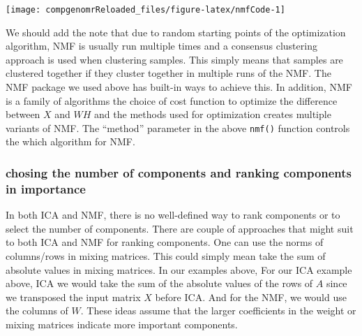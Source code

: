 \documentclass[12pt,]{krantz}
\newenvironment{Shaded}{\begin{snugshade}}{\end{snugshade}}
\newcommand{\CommentTok}[1]{\textcolor[rgb]{0.56,0.35,0.01}{\textit{#1}}}
\newcommand{\DataTypeTok}[1]{\textcolor[rgb]{0.13,0.29,0.53}{#1}}
\newcommand{\DecValTok}[1]{\textcolor[rgb]{0.00,0.00,0.81}{#1}}
\newcommand{\KeywordTok}[1]{\textcolor[rgb]{0.13,0.29,0.53}{\textbf{#1}}}
\newcommand{\NormalTok}[1]{#1}
\newcommand{\OperatorTok}[1]{\textcolor[rgb]{0.81,0.36,0.00}{\textbf{#1}}}
\newcommand{\StringTok}[1]{\textcolor[rgb]{0.31,0.60,0.02}{#1}}
\begin{document}
\begin{Shaded}
\end{Shaded}

\begin{center}\texttt{[image: compgenomrReloaded\_files/figure-latex/nmfCode-1]} \end{center}

We should add the note that due to random starting points of the optimization algorithm, NMF is usually run multiple times and a consensus clustering approach is used when clustering samples. This simply means that samples are clustered together if they cluster together in multiple runs of the NMF. The NMF package we used above has built-in ways to achieve this. In addition, NMF is a family of algorithms the choice of cost function to optimize the difference between \(X\) and \(WH\) and the methods used for optimization creates multiple variants of NMF. The ``method'' parameter in the above \texttt{nmf()} function controls the which algorithm for NMF.

\hypertarget{chosing-the-number-of-components-and-ranking-components-in-importance}{%
\subsubsection{chosing the number of components and ranking components in importance}\label{chosing-the-number-of-components-and-ranking-components-in-importance}}

In both ICA and NMF, there is no well-defined way to rank components or to select the number of components. There are couple of approaches that might suit to both ICA and NMF for ranking components. One can use the norms of columns/rows in mixing matrices. This could simply mean take the sum of absolute values in mixing matrices. In our examples above, For our ICA example above, ICA we would take the sum of the absolute values of the rows of \(A\) since we transposed the input matrix \(X\) before ICA. And for the NMF, we would use the columns of \(W\). These ideas assume that the larger coefficients in the weight or mixing matrices indicate more important components.
\end{document}

